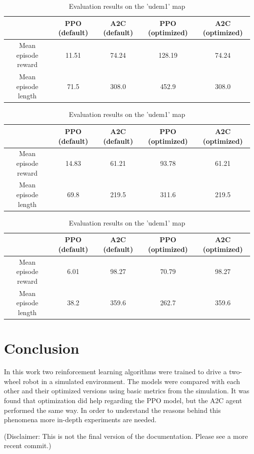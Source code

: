 \documentclass{article}
\begin{document}
\begin{table}[H]
	\caption{Evaluation results on the 'zigzag\_dists' map}
	\begin{center}
	\begin{tabular}{|c| c| c| c| c|}
		\hline
	  & PPO (default) & A2C (default) & PPO (optimized) & A2C (optimized) \\
	\hline
	Mean episode reward & 11.51 & 74.24 & 128.19 & 74.24 \\
	\hline
	Mean episode length & 71.5 & 308.0 & 452.9& 308.0 \\
	\hline
	\end{tabular}
	\end{center}
	\label{t:zigzagdists}

	\caption{Evaluation results on the 'small\_loop' map}
	\begin{center}
	\begin{tabular}{|c| c | c| c | c|}
		\hline
	  & PPO (default) & A2C (default) & PPO (optimized) & A2C (optimized) \\
	\hline
	Mean episode reward & 14.83 & 61.21 & 93.78 & 61.21 \\
	\hline
	Mean episode length & 69.8 & 219.5 & 311.6 & 219.5 \\
	\hline
	\end{tabular}
	\end{center}
	\label{t:smalloop}

	\caption{Evaluation results on the 'udem1' map}
	\begin{center}
	\begin{tabular}{|c| c| c| c| c|}
		\hline
	  & PPO (default) & A2C (default) & PPO (optimized) & A2C (optimized) \\
	\hline
	Mean episode reward & 6.01 & 98.27 & 70.79 & 98.27 \\
	\hline
	Mean episode length & 38.2 & 359.6 & 262.7 & 359.6 \\
	\hline
	\end{tabular}
	\end{center}
	\label{t:udem1}
\end{table}

\section{\large{Conclusion}}
In this work two reinforcement learning algorithms were trained to drive a two-wheel robot in a simulated environment. The models were compared with each other and their optimized versions using basic metrics from the simulation. It was found that optimization did help regarding the PPO model, but the A2C agent performed the same way. In order to understand the reasons behind this phenomena more in-depth experiments are needed.

(Disclaimer: This is not the final version of the documentation. Please see a more recent commit.)


%

%
\end{document}
